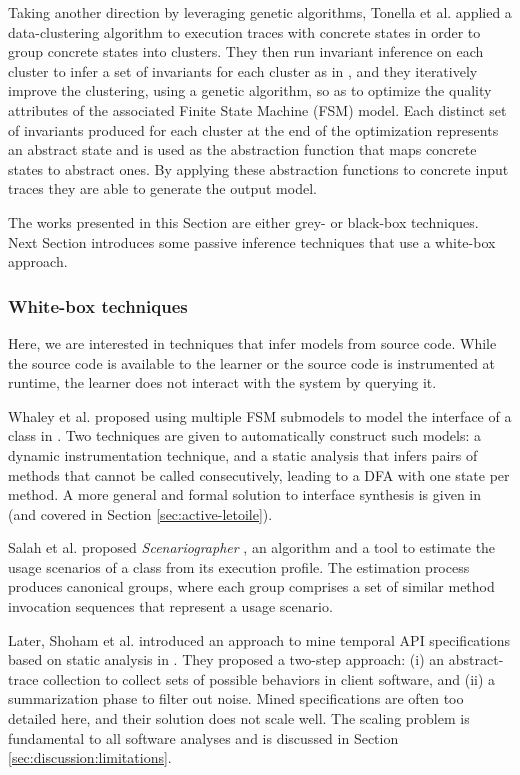 Taking another direction by leveraging genetic algorithms,
Tonella et al. \cite{TonellaNMLH13} applied a data-clustering
algorithm to execution traces with concrete states in order to
group concrete states into clusters. They then run invariant
inference on each cluster to infer a set of invariants for each
cluster as in \cite{Ernst:1999:DDL:302405.302467,Ernst200735},
and they iteratively improve the clustering, using a genetic
algorithm, so as to optimize the quality attributes of the
associated Finite State Machine (FSM) model. Each distinct set of
invariants produced for each cluster at the end of the
optimization represents an abstract state and is used as the
abstraction function that maps concrete states to abstract ones.
By applying these abstraction functions to concrete input traces
they are able to generate the output model.

The works presented in this Section are either grey- or black-box
techniques. Next Section introduces some passive inference
techniques that use a white-box approach.


\subsubsection{White-box techniques}
\label{sec:passive-white}

Here, we are interested in techniques that infer models from
source code. While the source code is available to the learner or
the source code is instrumented at runtime, the learner does not
interact with the system by querying it.

Whaley et al. proposed using multiple FSM submodels to model the
interface of a class in \cite{Whaley:2002:AEO:566171.566212}. Two
techniques are given to automatically construct such models: a
dynamic instrumentation technique, and a static analysis that
infers pairs of methods that cannot be called consecutively,
leading to a DFA with one state per method. A more general and
formal solution to interface synthesis is given in
\cite{Alur:2005:SIS:1047659.1040314} (and covered in Section
\ref{sec:active-letoile}).

Salah et al. proposed \textit{Scenariographer}
\cite{Salah05scenariographer}, an algorithm and a tool to
estimate the usage scenarios of a class from its execution
profile. The estimation process produces canonical groups, where
each group comprises a set of similar method invocation sequences
that represent a usage scenario.

Later, Shoham et al. introduced an approach to mine temporal API
specifications based on static analysis in
\cite{Shoham:2007:SSM:1273463.1273487}. They proposed a two-step
approach: (i) an abstract-trace collection to collect sets of
possible behaviors in client software, and (ii) a summarization
phase to filter out noise. Mined specifications are often too
detailed here, and their solution does not scale well. The
scaling problem is fundamental to all software analyses and is
discussed in Section \ref{sec:discussion:limitations}.

